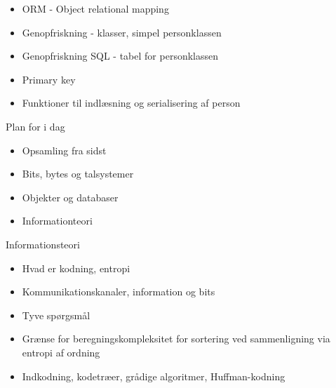 \documentclass[a4paper,landscape]{slides}
\begin{document}
\begin{slide}
\begin{itemize}
    \item  ORM - Object relational mapping
    \item  Genopfriskning - klasser, simpel personklassen
    \item  Genopfriskning SQL - tabel for personklassen
    \item  Primary key
    \item  Funktioner til indlæsning og serialisering af person
\end{itemize} \end{slide} \begin{slide}\begin{center} {\large Plan for i dag } \end{center} \begin{itemize} \addtolength{\itemsep}{-\baselineskip} \item  Opsamling fra sidst \item  Bits, bytes og talsystemer \item  Objekter og databaser \item  Informationteori
\end{itemize} \end{slide} \begin{slide}\begin{center} {\large Informationsteori } \end{center} \begin{itemize} \addtolength{\itemsep}{-\baselineskip}
    \item  Hvad er kodning, entropi
    \item  Kommunikationskanaler, information og bits
    \item  Tyve spørgsmål
    \item  Grænse for beregningskompleksitet for sortering ved sammenligning via entropi af ordning
    \item  Indkodning, kodetræer, grådige algoritmer, Huffman-kodning
	\end{itemize}
\end{slide}
\end{document}
